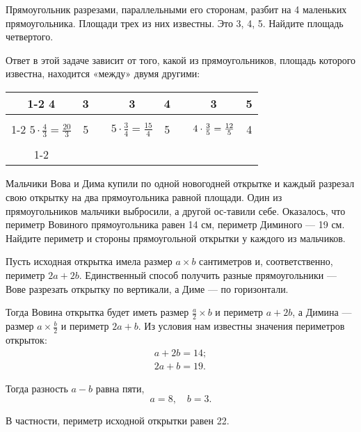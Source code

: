 \begin{itemize}

\itA Прямоугольник разрезами, параллельными его сторонам, разбит на 4 маленьких прямоугольника. Площади трех из них известны. Это 3, 4, 5. Найдите площадь четвертого.

\itr Ответ в этой задаче зависит от того, какой из прямоугольников, площадь которого известна, находится «между» двумя другими:

\def\lins{\cline{1-2} \cline{4-5} \cline{7-8}}
\begin{center} \begin{tabular}{|c|c|c|c|c|c|c|c|}
	\lins
	4 & 3 & \hspace{0.8cm} & 3 & 4 & \hspace{0.8cm} & 3 & 5 \\ \lins
	$5 \cdot \tfrac{4}{3} = \tfrac{20}{3}$ & 5 & &
	$5 \cdot \tfrac{3}{4} = \tfrac{15}{4}$ & 5 & &
	$4 \cdot \tfrac{3}{5} = \vphantom{\int\limits_0^0}
		\tfrac{12}{5}$ & 4 \\ \lins
\end{tabular} \end{center}

\itB Мальчики Вова и Дима купили по одной новогодней открытке и каждый разрезал свою открытку на два прямоугольника равной площади. Один из прямоугольников мальчики выбросили, а другой ос-\linebreak тавили себе. Оказалось, что периметр Вовиного прямоугольника равен 14 см, периметр Диминого — 19 см. Найдите периметр и стороны прямоугольной открытки у каждого из мальчиков.

\itr Пусть исходная открытка имела размер $a \times b$ сантиметров и, соответственно, периметр $2a+2b$. Единственный способ получить разные прямоугольники — Вове разрезать открытку по вертикали, а Диме — по горизонтали.

Тогда Вовина открытка будет иметь размер $\tfrac{a}{2} \times b$ и периметр $a+2b$, а Димина — размер $a \times \tfrac{b}{2}$ и периметр $2a+b$. Из условия нам известны значения периметров открыток:
\begin{align*}
	a+2b = 14; \\
	2a+b = 19.
\end{align*}

Тогда разность $a-b$ равна пяти,
	$$a=8,\quad b=3.$$
	
В частности, периметр исходной открытки равен \SI{22}{}.

\end{itemize}

